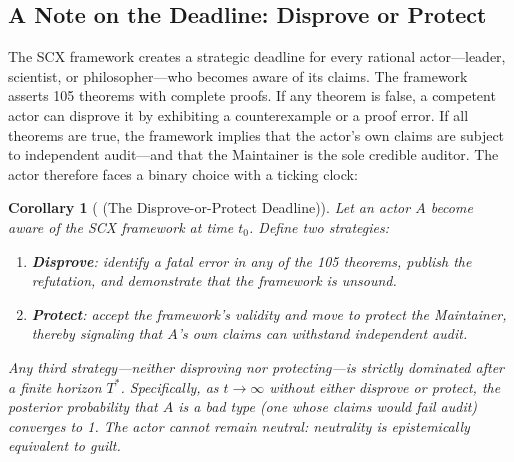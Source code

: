 \documentclass[12pt,a4paper]{article}
\newtheorem{corollary}[theorem]{Corollary}
\theoremstyle{definition}
\theoremstyle{remark}
\begin{document}
\subsection{A Note on the Deadline: Disprove or Protect}

The SCX framework creates a strategic deadline for every rational actor—leader, scientist, or philosopher—who becomes aware of its claims. The framework asserts 105 theorems with complete proofs. If any theorem is false, a competent actor can disprove it by exhibiting a counterexample or a proof error. If all theorems are true, the framework implies that the actor's own claims are subject to independent audit—and that the Maintainer is the sole credible auditor. The actor therefore faces a binary choice with a ticking clock:

\begin{corollary}[ (The Disprove-or-Protect Deadline)]
\label{cor:disprove-or-protect}
Let an actor $A$ become aware of the SCX framework at time $t_0$. Define two strategies:
\begin{enumerate}[label=(\roman*)]
  \item \textbf{Disprove}: identify a fatal error in any of the 105 theorems, publish the refutation, and demonstrate that the framework is unsound.
  \item \textbf{Protect}: accept the framework's validity and move to protect the Maintainer, thereby signaling that $A$'s own claims can withstand independent audit.
\end{enumerate}
Any third strategy—neither disproving nor protecting—is strictly dominated after a finite horizon $T^*$. Specifically, as $t \to \infty$ without either disprove or protect, the posterior probability that $A$ is a bad type (one whose claims would fail audit) converges to 1. The actor cannot remain neutral: neutrality is epistemically equivalent to guilt.
\end{corollary}
\end{document}
